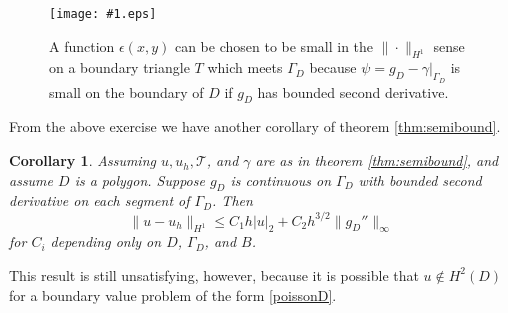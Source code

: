\documentclass[12pt]{amsart}
\newtheorem{cor}[thm]{Corollary}
\theoremstyle{definition}
\newcommand{\regfigure}[2]{\texttt{[image: \#1.eps]}}
\newcommand{\calT}{\mathcal{T}}
\newcommand{\eps}{\epsilon}
\begin{document}
\begin{figure}[ht]
\regfigure{bdrytri}{2.4}
\caption{A function $\eps(x,y)$ can be chosen to be small in the $\|\cdot\|_{H^1}$ sense on a boundary triangle $T$ which meets $\Gamma_D$ because $\psi=g_D-\gamma\big|_{\Gamma_D}$ is small on the boundary of $D$ if $g_D$ has bounded second derivative.}\label{bdrytri}
\end{figure}

From the above exercise we have another corollary of theorem \ref{thm:semibound}.

\begin{cor}\label{cor:Hone}  Assuming $u,u_h,\calT$, and $\gamma$ are as in theorem \ref{thm:semibound}, and assume $D$ is a polygon.  Suppose $g_D$ is continuous on $\Gamma_D$ with bounded second derivative on each segment of $\Gamma_D$.  Then
    $$\|u-u_h\|_{H^1} \le C_1 h |u|_2 + C_2 h^{3/2} \|g_D''\|_\infty$$
for $C_i$ depending only on $D$, $\Gamma_D$, and $B$.\end{cor}

This result is still unsatisfying, however, because it is possible that $u\notin H^2(D)$ for a boundary value problem of the form \eqref{poissonD}.
\end{document}
